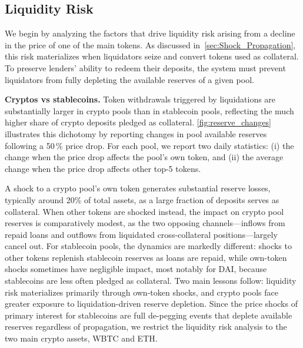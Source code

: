 \documentclass[a4paper,UKenglish,cleveref, autoref, thm-restate]{informs3}
\newcommand{\boldpara}[1]{\noindent\textbf{#1}\quad}
\begin{document}
\subsection{Liquidity Risk}
\label{sec:results_liquidity}

We begin by analyzing the factors that drive liquidity risk arising from a decline in the price of one of the main tokens. As discussed in~\autoref{sec:Shock_Propagation}, this risk materializes when liquidators seize and convert tokens used as collateral. To preserve
lenders' ability to redeem their deposits, the system must prevent liquidators from fully depleting the available reserves of a given pool.

\medskip

\boldpara{Cryptos vs stablecoins.}
Token withdrawals triggered by liquidations are substantially larger in crypto pools than in stablecoin pools, reflecting the much higher share of crypto deposits pledged as collateral. \autoref{fig:reserve_changes} illustrates this dichotomy by reporting changes in pool available
reserves following a 50\,\% price drop. For each pool, we report two daily statistics: (i) the change when the price drop affects the pool's own token, and (ii) the average change when the price drop affects other top-5 tokens. 

A shock to a crypto pool's own token generates substantial reserve losses, typically around 20\% of total assets, as a large fraction of deposits serves as collateral. When other tokens are shocked instead, the impact on crypto pool reserves is comparatively modest, as the two opposing channels---inflows from repaid loans and outflows from liquidated cross-collateral positions---largely cancel out. For stablecoin pools, the dynamics are markedly different: shocks to other tokens replenish stablecoin reserves as loans are repaid, while own-token shocks sometimes have negligible impact, most notably for DAI, because stablecoins are less often pledged as collateral. Two main lessons follow: liquidity risk materializes primarily through own-token shocks, and crypto pools face greater exposure to liquidation-driven reserve depletion. Since the price shocks of primary interest for stablecoins are full de-pegging events that deplete available reserves regardless of 
propagation, we restrict the liquidity risk analysis to the two main crypto assets, WBTC and ETH.
\end{document}
